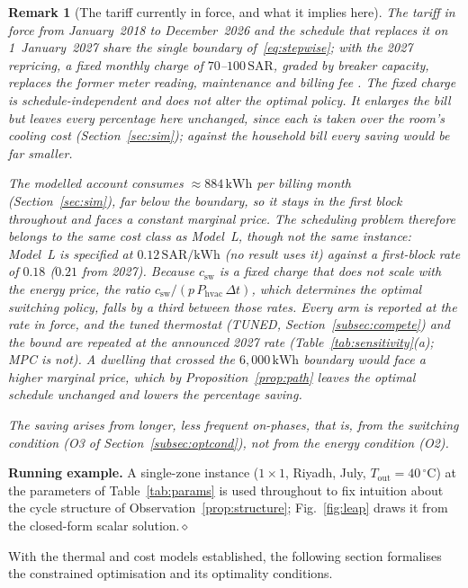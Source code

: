 \documentclass[pdflatex,sn-mathphys-num,iicol]{sn-jnl}
\theoremstyle{thmstyleone}\newtheorem{proposition}{Proposition}\newtheorem{corollary}{Corollary}
\theoremstyle{thmstyletwo}\newtheorem{remark}{Remark}\newtheorem{observation}{Observation}
\theoremstyle{thmstylethree}\newtheorem{definition}{Definition}
\newcommand{\Tout}{T_{\mathrm{out}}}
\newcommand{\csw}{c_{\mathrm{sw}}}
\newcommand{\Phvac}{P_{\mathrm{hvac}}}
\newcommand{\SAR}{\text{SAR}}
\newcommand{\kWh}{\text{kWh}}
\begin{document}
\begin{remark}[The tariff currently in force, and what it implies here]
\label{rem:current_tariff}
The tariff in force from January~2018 to December~2026 \citep{SEC2024} and the schedule that replaces it on 1~January~2027 share the single boundary of~\eqref{eq:stepwise}; with the 2027 repricing, a fixed monthly charge of $70$--$100\,\SAR$, graded by breaker capacity, replaces the former meter reading, maintenance and billing fee \citep{SaudiEnergy2027}. The fixed charge is schedule-independent and does not alter the optimal policy. It enlarges the bill but leaves every percentage here unchanged, since each is taken over the room's cooling cost (Section~\ref{sec:sim}); against the household bill every saving would be far smaller.

The modelled account consumes ${\approx}884\,\kWh$ per billing month (Section~\ref{sec:sim}), far below the boundary, so it stays in the first block throughout and faces a \emph{constant} marginal price. The scheduling problem therefore belongs to the same cost class as Model~L, though not the same instance: Model~L is specified at $0.12\,\SAR/\kWh$ (no result uses it) against a first-block rate of $0.18$ ($0.21$ from 2027). Because $\csw$ is a fixed charge that does not scale with the energy price, the ratio $\csw/(p\,\Phvac\,\Delta t)$, which determines the optimal switching policy, falls by a third between those rates. Every arm is reported at the rate in force, and the tuned thermostat (TUNED, Section~\ref{subsec:compete}) and the bound are repeated at the announced 2027 rate (Table~\ref{tab:sensitivity}(a); MPC is not). A dwelling that crossed the $6{,}000\,\kWh$ boundary would face a higher marginal price, which by Proposition~\ref{prop:path} leaves the optimal schedule unchanged and lowers the percentage saving.

The saving arises from longer, less frequent on-phases, that is, from the switching condition (O3 of Section~\ref{subsec:optcond}), not from the energy condition (O2).
\end{remark}
 

 
\noindent\textbf{Running example.} A single-zone instance ($1\times1$, Riyadh,
July, $\Tout=40\,^\circ$C) at the parameters of Table~\ref{tab:params} is used throughout to fix intuition about the cycle structure of Observation~\ref{prop:structure}; Fig.~\ref{fig:leap} draws it from the closed-form scalar solution.\hfill$\diamond$
 
With the thermal and cost models established, the following section formalises the constrained optimisation and its optimality conditions.
 
\end{document}
